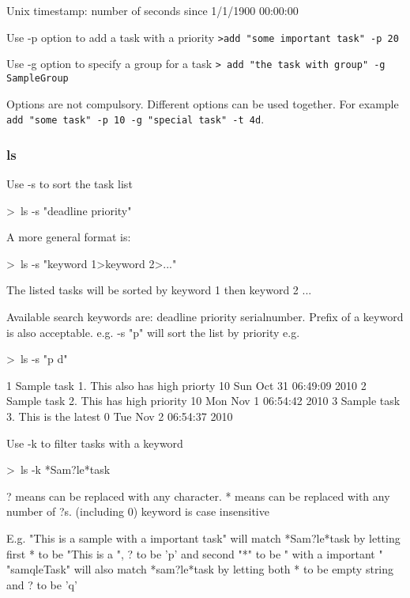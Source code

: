 \documentclass[12pt, a4paper]{article}
\begin{document}
    Unix timestamp:     number of seconds since 1/1/1900 00:00:00

Use -p option to add a task with a priority
\texttt{\textgreater add "some important task" -p 20}

Use -g option to specify a group for a task
\texttt{\textgreater \ add "the task with group"\footnotemark \  -g SampleGroup}


Options are not compulsory. Different options can be used together. For example \texttt{add "some task" -p 10 -g "special task" -t 4d}.

\subsubsection{ls}

Use -s to sort the task list

    \textgreater \ ls -s "deadline priority"
    
    A more general format is:

    \textgreater \ ls -s "\textlesssearch keyword 1\textgreater \textlesssearch keyword 2\textgreater ..."

    The listed tasks will be sorted by keyword 1 then keyword 2 ...
    
    Available search keywords are: deadline priority serialnumber. Prefix of a keyword is also acceptable. e.g. \textgreaterls -s "p" will sort the list by priority
    e.g.

    \textgreater \ ls -s "p d"

    1   Sample task 1. This also has high priorty   10  Sun Oct 31 06:49:09 2010
    2   Sample task 2. This has high priority       10  Mon Nov  1 06:54:42 2010
    3   Sample task 3. This is the latest           0   Tue Nov  2 06:54:37 2010


Use -k to filter tasks with a keyword

    \textgreater \ ls -k *Sam?le*task

    ? means can be replaced with any character.
    * means can be replaced with any number of ?s. (including 0)
    keyword is case insensitive

    E.g.    "This is a sample with a important task" will match *Sam?le*task by letting first * to be "This is a ", ? to be 'p' and second "*" to be " with a important " 
            "samqleTask" will also match *sam?le*task by letting both * to be empty string and ? to be 'q' 
\end{document}

